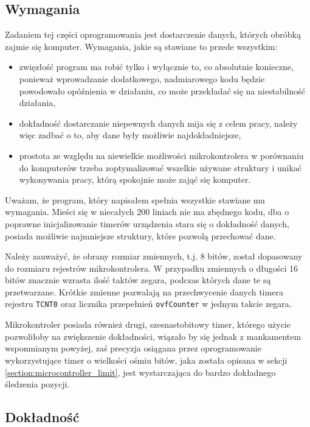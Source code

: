 \subsection{Wymagania}
Zadaniem tej części oprogramowania jest dostarczenie danych, których obróbką zajmie się komputer. Wymagania, jakie są stawiane to przede wszystkim:
\begin{itemize}
 \item zwięzłość \ppauza program ma robić tylko i wyłącznie to, co absolutnie konieczne, ponieważ wprowadzanie dodatkowego, nadmiarowego kodu będzie powodowało opóźnienia w działaniu, co może przekładać się na
    niestabilność działania,
 \item dokładność \ppauza dostarczanie niepewnych danych mija się z celem pracy, należy więc zadbać o to, aby dane były możliwie najdokładniejsze,
 \item prostota \ppauza ze względu na niewielkie możliwości mikrokontrolera \ppauza w porównaniu do komputerów \ppauza trzeba zoptymalizować wszelkie używane struktury i unikać wykonywania pracy, którą spokojnie może zająć się komputer.
\end{itemize}

Uważam, że program, który napisałem spełnia wszystkie stawiane mu wymagania. Mieści się w niecałych 200 liniach \ppauza nie ma zbędnego kodu, dba o poprawne inicjalizowanie timerów urządzenia \ppauza stara się o dokładność danych, posiada możliwie najmniejsze struktury, które pozwolą przechować dane.

Należy zauważyć, że obrany rozmiar zmiennych, t.j. 8 bitów, został dopasowany do rozmiaru rejestrów mikrokontrolera. W przypadku zmiennych o długości 16 bitów znacznie wzrasta ilość taktów zegara, podczas których dane te są przetwarzane. Krótkie zmienne pozwalają na przechwycenie danych timera \ppauza rejestru \texttt{TCNT0} oraz licznika przepełnień \texttt{ovfCounter} \ppauza w jednym takcie zegara.

Mikrokontroler posiada również drugi, szesnastobitowy timer, którego użycie pozwoliłoby na zwiększenie dokładności, wiązało by się jednak z mankamentem wspomnianym powyżej, zaś precyzja osiągana przez oprogramowanie wykorzystujące timer o wielkości ośmiu bitów, jaka została opisana w sekcji \ref{section:microcontroller_limit}, jest wystarczająca do bardzo dokładnego śledzenia pozycji.

\subsection{Dokładność}\label{section:precision}

